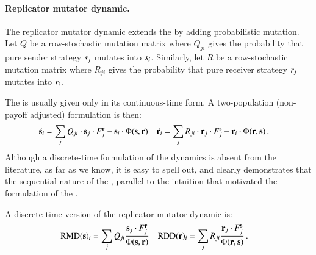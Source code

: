 \paragraph{Replicator mutator dynamic.} The replicator mutator dynamic
extends the \rd by adding probabilistic mutation. Let $Q$ be a
row-stochastic mutation matrix where $Q_{ji}$ gives the probability
that pure sender strategy $s_j$ mutates into
$s_i$. Similarly, let $R$ be a row-stochastic mutation matrix
where $R_{ji}$ gives the probability that pure receiver strategy
$r_j$ mutates into $r_i$.

The \rmd is usually given only in its continuous-time form. A
two-population (non-payoff adjusted) formulation is then:
\begin{align*}
  \dot{\mathrm{\mathbf{s}}_i} & = \sum_{j}  Q_{ji} \cdot \mathrm{\mathbf{s}}_j
    \cdot F_j^{\mathrm{\mathbf{r}}} - \mathrm{\mathbf{s}}_i \cdot \Phi(\mathrm{\mathbf{s}},\mathrm{\mathbf{r}}) &
    \dot{\mathrm{\mathbf{r}}_i} & = \sum_{j}  R_{ji} \cdot \mathrm{\mathbf{r}}_j
    \cdot F_j^{\mathrm{\mathbf{s}}} - \mathrm{\mathbf{r}}_i \cdot \Phi(\mathrm{\mathbf{r}},\mathrm{\mathbf{s}}) \,.
\end{align*}
Although a discrete-time formulation of the dynamics is absent from the
literature, as far as we know, it is easy to spell out, and clearly
demonstrates that the sequential nature of the \rmd, parallel to the
intuition that motivated the formulation of the \rdd.

\begin{claim} A discrete time version of the replicator mutator
  dynamic is:
  \begin{align*}
    \mathrm{RMD}(\mathrm{\mathbf{s}})_i & = \sum_{j} Q_{ji} \frac{\mathrm{\mathbf{s}}_j \cdot
      F_j^{\mathrm{\mathbf{r}}}}{ \Phi(\mathrm{\mathbf{s}},\mathrm{\mathbf{r}})} & \mathrm{RDD}(\mathrm{\mathbf{r}})_i & =
    \sum_{j} R_{ji} \frac{\mathrm{\mathbf{r}}_j \cdot F_j^{\mathrm{\mathbf{s}}}}{
      \Phi(\mathrm{\mathbf{r}},\mathrm{\mathbf{s}})}\,.
  \end{align*}
\end{claim}


